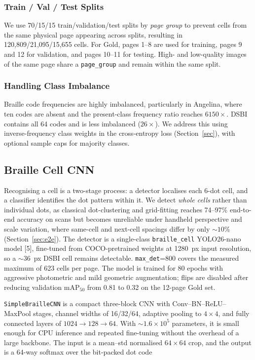 \documentclass{article}
\begin{document}
\subsubsection{Train / Val / Test Splits}
We use 70/15/15 train/validation/test splits by \emph{page group} to prevent cells from the same physical page appearing across splits, resulting in 120,809/21,095/15,655 cells. For Gold, pages 1--8 are used for training, pages 9 and 12 for validation, and pages 10--11 for testing. High- and low-quality images of the same page share a \texttt{page\_group} and remain within the same split.

\subsubsection{Handling Class Imbalance}
Braille code frequencies are highly imbalanced, particularly in Angelina, where ten codes are absent and the present-class frequency ratio reaches $6150\times$. DSBI contains all 64 codes and is less imbalanced ($26\times$). We address this using inverse-frequency class weights in the cross-entropy loss (Section~\ref{sec}), with optional sample caps for majority classes.

\subsection{Braille Cell CNN}
\label{sec:cnn}
\label{sec:celldet}

Recognising a cell is a two-stage process: a detector localises each 6-dot cell, and a classifier identifies the dot pattern within it. We detect \emph{whole cells} rather than individual dots, as classical dot-clustering and grid-fitting reaches 74--97\% end-to-end accuracy on scans but becomes unreliable under handheld perspective and scale variation, where same-cell and next-cell spacings differ by only \(\sim 10\%\) (Section~\ref{sec:e2e}). The detector is a single-class \texttt{braille\_cell} YOLO26-nano model [5], fine-tuned from COCO-pretrained weights at 1280~px input resolution, so a \(\sim 36\)~px DSBI cell remains detectable. \texttt{max\_det}=800 covers the measured maximum of 623 cells per page. The model is trained for 80 epochs with aggressive photometric and mild geometric augmentation; flips are disabled after reducing validation mAP$_{50}$ from 0.81 to 0.32 on the 12-page Gold set.


\texttt{SimpleBrailleCNN} is a compact three-block CNN with Conv--BN--ReLU--MaxPool stages, channel widths of 16/32/64, adaptive pooling to $4\times4$, and fully connected layers of $1024\rightarrow128\rightarrow64$. With $\sim1.6\times10^5$ parameters, it is small enough for CPU inference and repeated fine-tuning without the overhead of a large backbone. The input is a mean--std normalised $64\times64$ crop, and the output is a 64-way softmax over the bit-packed dot code
\end{document}
